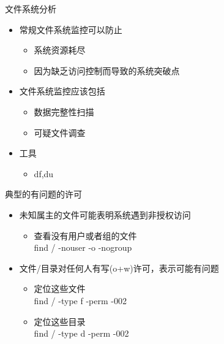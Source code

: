  \begin{frame}{文件系统分析}
\begin{itemize}
\item 常规文件系统监控可以防止

\begin{itemize}
\item 系统资源耗尽
\item 因为缺乏访问控制而导致的系统突破点
\end{itemize}
\item 文件系统监控应该包括

\begin{itemize}
\item 数据完整性扫描
\item 可疑文件调查
\end{itemize}
\item 工具

\begin{itemize}
\item df,du
\end{itemize}
\end{itemize}

\end{frame} 


 \begin{frame}{典型的有问题的许可}
\begin{itemize}
\item 未知属主的文件可能表明系统遇到非授权访问

\begin{itemize}
\item 查看没有用户或者组的文件\\
find / -nouser -o -nogroup 
\end{itemize}
\item 文件/目录对任何人有写(o+w)许可，表示可能有问题

\begin{itemize}
\item 定位这些文件\\
find / -type f -perm -002
\item 定位这些目录\\
find / -type d -perm -002
\end{itemize}
\end{itemize}

\end{frame} 


